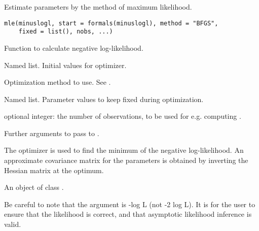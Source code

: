 %
\begin{Description}\relax
Estimate parameters by the method of maximum likelihood.
\end{Description}
%
\begin{Usage}
\begin{verbatim}
mle(minuslogl, start = formals(minuslogl), method = "BFGS",
    fixed = list(), nobs, ...)
\end{verbatim}
\end{Usage}
%
\begin{Arguments}
\begin{ldescription}
\item[\code{minuslogl}] Function to calculate negative log-likelihood.
\item[\code{start}] Named list. Initial values for optimizer.
\item[\code{method}] Optimization method to use. See .
\item[\code{fixed}] Named list.  Parameter values to keep fixed during
optimization.
\item[\code{nobs}] optional integer: the number of observations, to be used for
e.g. computing .
\item[\code{...}] Further arguments to pass to .
\end{ldescription}
\end{Arguments}
%
\begin{Details}\relax
The  optimizer is used to find the minimum of the
negative log-likelihood.  An approximate covariance matrix for the
parameters is obtained by inverting the Hessian matrix at the optimum.
\end{Details}
%
\begin{Value}
An object of class .
\end{Value}
%
\begin{Note}\relax
Be careful to note that the argument is -log L (not -2 log L). It
is for the user to ensure that the likelihood is correct, and that
asymptotic likelihood inference is valid.
\end{Note}
%
\begin{SeeAlso}\relax
{}
\end{SeeAlso}
%
